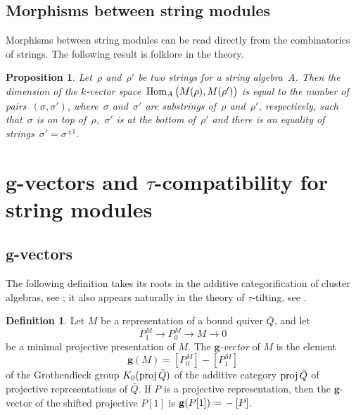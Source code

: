 \documentclass{amsart}
\newtheorem{proposition}[theorem]{Proposition}
\theoremstyle{definition}
\newtheorem{definition}[theorem]{Definition}
\renewcommand{\b}[1]{\mathbf{#1}} %
\newcommand{\eqdef}{\mbox{\,\raisebox{0.2ex}{\scriptsize\ensuremath{\mathrm:}}\ensuremath{=}\,}} %
\newcommand{\darkblue}{\color{darkblue}} %
\newcommand{\defn}[1]{\textsl{\darkblue #1}} %
\newcommand{\Hom}[1]{\operatorname{{\rm Hom}}_{#1}}
\newcommand{\proj}{\operatorname{{\rm proj}}}
\begin{document}
\subsection{Morphisms between string modules}
\label{subsec:morphismsStringModules}

Morphisms between string modules can be read directly from the combinatorics of strings.  The following result is folklore in the theory.

\begin{proposition}
\label{prop:morphismsStringModules}
Let~$\rho$ and~$\rho'$ be two strings for a string algebra~$A$.
Then the dimension of the $k$-vector space~$\Hom{A} \big( M(\rho), M(\rho') \big)$ is equal to the number of pairs~$(\sigma, \sigma')$, where~$\sigma$ and~$\sigma'$ are substrings of~$\rho$ and~$\rho'$, respectively, such that~$\sigma$ is on top of~$\rho$,~$\sigma'$ is at the bottom of~$\rho'$ and there is an equality of strings~$\sigma' = \sigma^{\pm 1}$.

\end{proposition}


\section{$\b{g}$-vectors and $\tau$-compatibility for string modules}
\label{sec:stringModules}

\subsection{$\b{g}$-vectors}
\label{subsec:gvectors}

The following definition takes its roots in the additive categorification of cluster algebras, see \cite{DehyKeller};
it also appears naturally in the theory of $\tau$-tilting, see \cite[Sect.~5.1]{AdachiIyamaReiten}.

\begin{definition}
\label{definition: g-vector of representation}
 Let $M$ be a representation of a bound quiver $\bar Q$, and let
 \[
  P^M_1 \to P^M_0 \to M \to 0
 \]
 be a minimal projective presentation of $M$.  
 The \defn{$\b{g}$-vector} of $M$ is the element 
 \[
  \b{g}(M) = [P_0^M­] - [P_1^M]
 \]
 of the Grothendieck group $K_0(\proj \bar Q)$ of the additive category $\proj \bar Q$ of projective representations of $\bar Q$. 
 If $P$ is a projective representation, then the $\b{g}$-vector of the shifted projective $P[1]$ is $\b{g}(P[1]) \eqdef -[P]$.
\end{definition}
\end{document}
